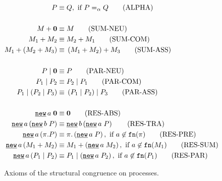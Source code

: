 \begin{figure}[h!]
\begin{align}
		P&\struc{}Q,\text{ if }P\alphaeq{}Q\tag{ALPHA}\label{sc_alpha}\\\notag\\
		\procchoice{M}{\proczero}&\struc{}M \tag{SUM-NEU}\label{sc_sum-neu} \\
		\procchoice{M_1}{M_2}&\struc{}\procchoice{M_2}{M_1}\tag{SUM-COM}\label{sc_sum-com}\\
		\procchoice{M_1}{\left(\procchoice{M_2}{M_3}\right)}&\struct{}\procchoice{\left(\procchoice{M_1}{M_2}\right)}{M_3}\tag{SUM-ASS\label{sc_sum-ass}}\\\notag\\
		\procpar{P}{\proczero}&\struc{}P \tag{PAR-NEU} \label{sc_par-neu}\\
		\procpar{P_1}{P_2}&\struc{}\procpar{P_2}{P_1}\tag{PAR-COM}\label{sc_par-com}\\
		\procpar{P_1}{\left(\procpar{P_2}{P_3}\right)}&\struct{}\procpar{\left(\procpar{P_1}{P_2}\right)}{P_3}\tag{PAR-ASS}\label{sc_par-ass}\\\notag\\
		\procres{a}{\proczero}&\struc{}\proczero \tag{RES-ABS} \label{sc_res-abs}\\
		\procres[()]{a}{\procres{b}{P}}&\struc{}\procres[()]{b}{\procres{a}{P}}\tag{RES-TRA}\label{sc_res-tra}\\
		\procres[()]{a}{\pi.P}&\struct{}\pi.\left(\procres{a}{P}\right),\text{ if }a\nin\fn{\pi}\tag{RES-PRE}\label{sc_res-pre}\\
		\procres[()]{a}{\procchoice{M_1}{M_2}}&\struct{}\procchoice{M_1}{\left(\procres{a}{M_2}\right)},\text{ if }a\nin\fn{M_1}\tag{RES-SUM}\label{sc_res-sum}\\
		\procres[()]{a}{\procpar{P_1}{P_2}}&\struct{}\procpar{P_1}{\left(\procres{a}{P_2}\right)},\text{ if }a\nin\fn{P_1}\tag{RES-PAR}\label{sc_res-par}%
\end{align}
\caption{Axioms of the structural congruence on processes.}
\label{fig_def_struct_cong}
\end{figure}
